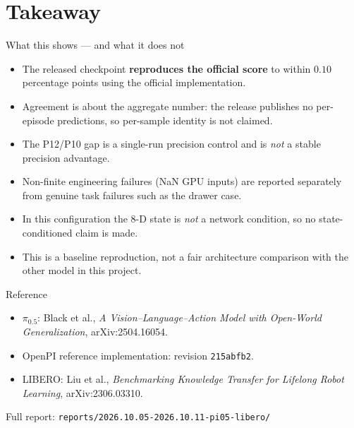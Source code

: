 \section{Takeaway}

\begin{frame}{What this shows --- and what it does not}
  \begin{itemize}
    \item The released checkpoint \textbf{reproduces the official score} to
          within $0.10$ percentage points using the official implementation.
    \item Agreement is about the aggregate number: the release publishes no
          per-episode predictions, so per-sample identity is not claimed.
    \item The P12/P10 gap is a single-run precision control and is \emph{not}
          a stable precision advantage.
    \item Non-finite engineering failures (NaN GPU inputs) are reported
          separately from genuine task failures such as the drawer case.
    \item In this configuration the 8-D state is \emph{not} a network
          condition, so no state-conditioned claim is made.
    \item This is a baseline reproduction, not a fair architecture comparison
          with the other model in this project.
  \end{itemize}
\end{frame}

\begin{frame}{Reference}
  \begin{itemize}
    \item \texorpdfstring{$\pi_{0.5}$}{pi-0.5}: Black et al., \emph{A
          Vision--Language--Action Model with Open-World Generalization},
          arXiv:2504.16054.
    \item OpenPI reference implementation: revision
          \texttt{215abfb2}.
    \item LIBERO: Liu et al., \emph{Benchmarking Knowledge Transfer for
          Lifelong Robot Learning}, arXiv:2306.03310.
  \end{itemize}
  \vfill
  \centering
  {\small Full report: \texttt{reports/2026.10.05-2026.10.11-pi05-libero/}}
\end{frame}
